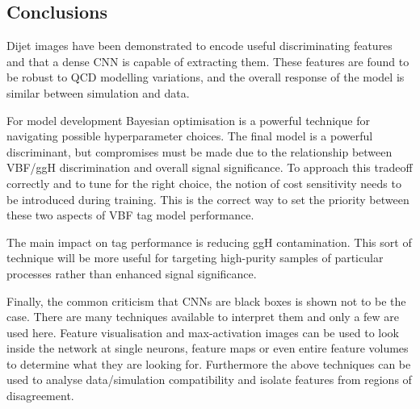 \subsection{Conclusions}
Dijet images have been demonstrated to encode useful discriminating features and that a dense CNN is capable of extracting them. These features are found to be robust to QCD modelling variations, and the overall response of the model is similar between simulation and data. 

For model development Bayesian optimisation is a powerful technique for navigating possible hyperparameter choices. The final model is a powerful discriminant, but compromises must be made due to the relationship between VBF/ggH discrimination and overall signal significance. 
To approach this tradeoff correctly and to tune for the right choice, the notion of cost sensitivity needs to be introduced during training. This is the correct way to set the priority between these two aspects of VBF tag model performance. 

The main impact on tag performance is reducing ggH contamination. This sort of technique will be more useful for targeting high-purity samples of particular processes rather than enhanced signal significance. 

Finally, the common criticism that CNNs are black boxes is shown not to be the case. There are many techniques available to interpret them and only a few are used here. Feature visualisation and max-activation images can be used to look inside the network at single neurons, feature maps or even entire feature volumes to determine what they are looking for. 
Furthermore the above techniques can be used to analyse data/simulation compatibility and isolate features from regions of disagreement. 



